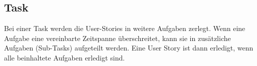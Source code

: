 \subsection{Task}
Bei einer Task werden die User-Stories in weitere Aufgaben zerlegt. Wenn eine Aufgabe eine vereinbarte Zeitspanne überschreitet, kann sie in zusätzliche Aufgaben (Sub-Tasks) aufgeteilt werden. Eine User Story ist dann erledigt, wenn alle beinhaltete Aufgaben erledigt sind. \cite{atlassian:jira-support}
